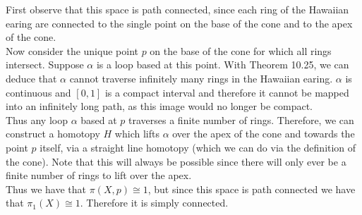 \documentclass[a4paper,12pt,twoside]{hmcpset}
\begin{document}
\begin{solution}
First observe that this space is path connected, since each ring of
the Hawaiian earing are connected to the single point on the base of
the cone and to the apex of the cone. 
\\

Now consider the unique point $p$ on the base of the cone for which
all rings intersect. Suppose $\alpha$ is a loop based at this point.
With Theorem 10.25, we can deduce that $\alpha$ cannot traverse
infinitely many rings in the Hawaiian earing. 
$\alpha$ is continuous and $[0, 1]$ is a compact
interval and therefore it cannot be mapped into an infinitely long path,
as this image would no longer be compact. 
\\

Thus any loop $\alpha$ based at $p$ traverses a finite number of
rings. Therefore, we can construct a homotopy $H$ which lifts $\alpha$
over the apex of the cone and towards the point $p$ itself, 
via a straight line homotopy (which we can do
via the definition of the cone). Note that this will always be
possible since there will only ever be a finite number of rings to
lift over the apex. 
\\

Thus we have that $\pi(X, p) \cong 1$, but since this space is path
connected we have that $\pi_1(X) \cong 1$. Therefore it is simply
connected. 
\end{solution}
\end{document}

